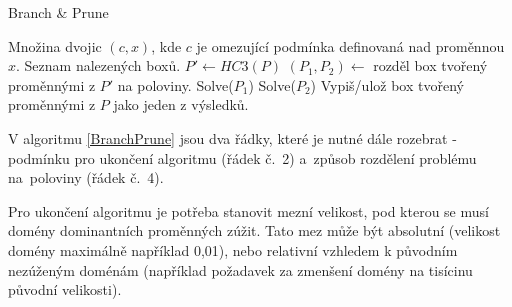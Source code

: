 \begin{algorithm}
\caption{Branch \& Prune}
\label{BranchPrune}
\begin{algorithmic}[1]
\Require Množina dvojic $(c, x)$, kde $c$ je omezující podmínka definovaná nad proměnnou $x$.
\Ensure Seznam nalezených boxů.
\State $P' \gets HC3(P)$
\State $(P_1, P_2) \gets $ rozděl box tvořený proměnnými z $P'$ na poloviny.
\State Solve($P_1$)
\State Solve($P_2$)
\Else
\State Vypiš/ulož box tvořený proměnnými z $P$ jako jeden z výsledků.
\EndIf
\EndProcedure
\end{algorithmic}
\end{algorithm}

V algoritmu \ref{BranchPrune} jsou dva řádky, které je nutné dále rozebrat - podmínku pro ukončení algoritmu (řádek č.~2) a~způsob rozdělení problému na~poloviny (řádek č.~4).

Pro ukončení algoritmu je potřeba stanovit mezní velikost, pod kterou se musí domény dominantních proměnných zúžit. Tato mez může být absolutní (velikost domény maximálně například 0,01), nebo relativní vzhledem k původním nezúženým doménám (například požadavek za zmenšení domény na tisícinu původní velikosti).


